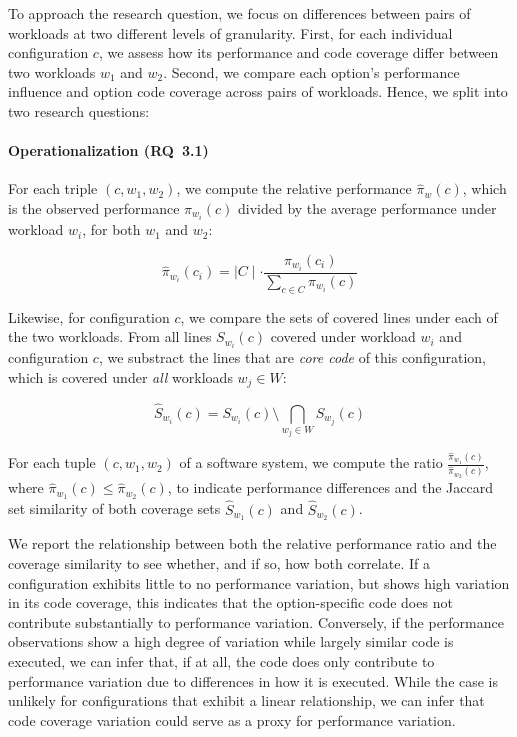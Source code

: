 To approach the research question, we focus on differences between pairs of workloads at two different levels of granularity. First, for each individual configuration $c$, we assess  how its performance and code coverage differ between two workloads $w_1$ and $w_2$. Second, we compare each option's performance influence and option code coverage across pairs of workloads. Hence, we split  into two research questions:



\paragraph*{Operationalization (RQ~3.1)} For each triple $(c, w_1, w_2)$, we compute the relative performance $\hat{\pi}_{w}(c)$, which is the observed performance $\pi_{w_i}(c)$ divided by the average performance under workload $w_i$, for both $w_1$ and $w_2$: 

\begin{equation}
	\hat{\pi}_{w_i}(c_i) =  \mid C \mid \cdot \frac{\pi_{w_i}(c_i)}{\sum_{c\in C} \pi_{w_i}(c)}
\end{equation}

Likewise, for configuration $c$, we compare the sets of covered lines under each of the two workloads. From all lines $S_{w_i}(c)$ covered under workload $w_i$ and configuration $c$, we substract the lines that are \emph{core code} of this configuration, which is covered under \emph{all} workloads $w_j \in W$:

\begin{equation}
\hat{S}_{w_i}(c)	 = S_{w_i}(c) \setminus \bigcap_{w_j\in W} S_{w_j}(c)
\end{equation}

For each tuple $(c, w_1, w_2)$ of a software system, we compute the ratio 
$\frac{\hat{\pi}_{w_1}(c) }{ \hat{\pi}_{w_2}(c) }$, where $\hat{\pi}_{w_1}(c) \leq \hat{\pi}_{w_2}(c)$, to indicate performance differences and the Jaccard set similarity of both coverage sets $\hat{S}_{w_1}(c)$ and $\hat{S}_{w_2}(c)$. 


We report the relationship between both the relative performance ratio and the coverage similarity to see whether, and if so, how both correlate. If a configuration exhibits little to no performance variation, but shows high variation in its code coverage, this indicates that the option-specific code does not contribute substantially to performance variation. Conversely, if the performance observations show a high degree of variation while largely similar code is executed, we can infer that, if at all, the code does only contribute to performance variation due to differences in how it is executed. While the case is unlikely for configurations that exhibit a linear relationship, we can infer that code coverage variation could serve as a proxy for performance variation. 

